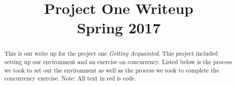 
\usepackage[T1]{fontenc}
\usepackage{geometry}
\geometry{textwidth=10cm}
\sffamily
\usepackage{listings}


\title{
	Project One Writeup \\
    {
    	\LARGE Spring 2017 
    }
}
\author{
}



\maketitle
\begin{abstract}
  This is our write up for the project one \textit{Getting Acquainted}. This project included setting up our environment and an exercise on concurrency. Listed below is the process we took to set out the environment as well as the process we took to complete the concurrency exercise. Note: All text in red is code.
\end{abstract}

\clearpage

